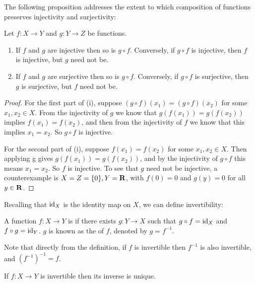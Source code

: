 The following proposition addresses the extent to which composition of functions preserves injectivity and surjectivity:
\begin{proposition}
Let $f:X\to Y$ and $g:Y\to Z$ be functions.
\begin{enumerate}[label=(\roman*)]
\item If $f$ and $g$ are injective then so is $g \circ f$. Conversely, if $g \circ f$ is injective, then $f$ is injective, but $g$ need not be.
\item If $f$ and $g$ are surjective then so is $g \circ f$. Conversely, if $g \circ f$ is surjective, then $g$ is surjective, but $f$ need not be.
\end{enumerate}
\end{proposition}
\begin{proof}
For the first part of (i), suppose $(g \circ f)(x_1) = (g \circ f)(x_2)$ for some $x_1, x_2 \in X$. From the injectivity of $g$ we know that $g(f(x_1)) = g(f(x_2))$ implies $f(x_1) = f(x_2)$, and then from the injectivity of $f$ we know that this implies $x_1 = x_2$. So $g \circ f$ is injective.

For the second part of (i), suppose $f(x_1) = f(x_2)$ for some $x_1, x_2 \in X$. Then applying g gives $g(f(x_1)) = g(f(x_2))$, and by the injectivity of $g \circ f$ this means $x_1 = x_2$. So $f$ is injective. To see that $g$ need not be injective, a counterexample is $X = Z = \{0\}, Y = \mathbf R$, with $f(0) = 0$ and $g(y) = 0$ for all $y \in \mathbf R$.
\end{proof}

Recalling that $\operatorname{id}_X$ is the identity map on $X$, we can define invertibility:

\begin{definition}[Invertibility]
A function $f:X\to Y$ is  if there exists $g:Y\to X$ such that $g\circ f=\operatorname{id}_X$ and $f\circ g=\operatorname{id}_Y$. $g$ is known as the  of $f$, denoted by $g=f^{-1}$.
\end{definition}

\begin{remark}
Note that directly from the definition, if $f$ is invertible then $f^{-1}$ is also invertible, and $(f^{-1})^{-1}=f$.
\end{remark}

\begin{proposition}
If $f:X \to Y$ is invertible then its inverse is unique.
\end{proposition}


